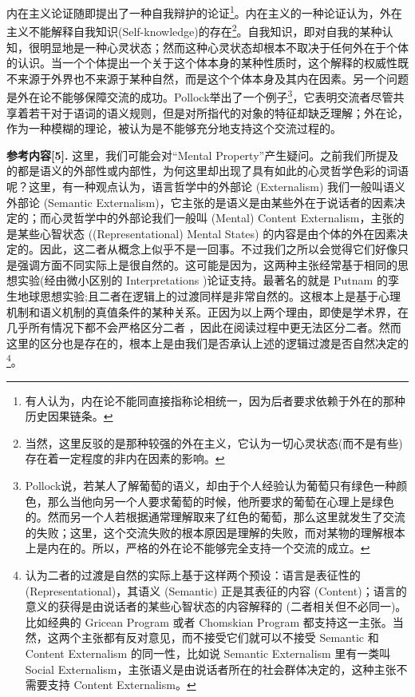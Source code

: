 \documentclass{article}
\begin{document}
内在主义论证随即提出了一种自我辩护的论证\footnote{有人认为，内在论不能同直接指称论相统一，因为后者要求依赖于外在的那种历史因果链条。}。内在主义的一种论证认为，外在主义不能解释自我知识(Self-knowledge)的存在\footnote{当然，这里反驳的是那种较强的外在主义，它认为一切心灵状态(而不是有些)存在着一定程度的非内在因素的影响。}。自我知识，即对自我的某种认知，很明显地是一种心灵状态；然而这种心灵状态却根本不取决于任何外在于个体的认识。当一个个体提出一个关于这个体本身的某种性质时，这个解释的权威性既不来源于外界也不来源于某种自然，而是这个个体本身及其内在因素。另一个问题是外在论不能够保障交流的成功。Pollock举出了一个例子\footnote{Pollock说，若某人了解葡萄的语义，却由于个人经验认为葡萄只有绿色一种颜色，那么当他向另一个人要求葡萄的时候，他所要求的葡萄在心理上是绿色的。然而另一个人若根据通常理解取来了红色的葡萄，那么这里就发生了交流的失败；这里，这个交流失败的根本原因是理解的失败，而对某物的理解根本上是内在的。所以，严格的外在论不能够完全支持一个交流的成立。}，它表明交流者尽管共享着若干对于语词的语义规则，但是对所指代的对象的特征却缺乏理解；外在论，作为一种模糊的理论，被认为是不能够充分地支持这个交流过程的。

\textbf{\kaishu 参考内容[5].}
{\kaishu 这里，我们可能会对“Mental Property”产生疑问。之前我们所提及的都是语义的外部性或内部性，为何这里却出现了具有如此的心灵哲学色彩的词语呢？这里，有一种观点认为，语言哲学中的外部论 (Externalism) 我们一般叫语义外部论 (Semantic Externalism)，它主张的是语义是由某些外在于说话者的因素决定的；而心灵哲学中的外部论我们一般叫 (Mental) Content Externalism，主张的是某些心智状态 ((Representational) Mental States) 的内容是由个体的外在因素决定的。因此，这二者从概念上似乎不是一回事。不过我们之所以会觉得它们好像只是强调方面不同实际上是很自然的。这可能是因为，这两种主张经常基于相同的思想实验(经由微小区别的 Interpretations )论证支持。最著名的就是 Putnam 的孪生地球思想实验;且二者在逻辑上的过渡同样是非常自然的。这根本上是基于心理机制和语义机制的真值条件的某种关系。正因为以上两个理由，即使是学术界，在几乎所有情况下都不会严格区分二者
，因此在阅读过程中更无法区分二者。然而这里的区分也是存在的，根本上是由我们是否承认上述的逻辑过渡是否自然决定的\footnote{认为二者的过渡是自然的实际上基于这样两个预设：语言是表征性的 (Representational)，其语义 (Semantic) 正是其表征的内容 (Content)；语言的意义的获得是由说话者的某些心智状态的内容解释的 (二者相关但不必同一)。比如经典的 Gricean Program 或者 Chomskian Program 都支持这一主张。当然，这两个主张都有反对意见，而不接受它们就可以不接受 Semantic 和 Content Externalism 的同一性，比如说 Semantic Externalism 里有一类叫 Social Externalism，主张语义是由说话者所在的社会群体决定的，这种主张不需要支持 Content Externalism。}。}
\end{document}
